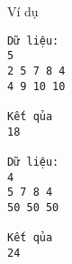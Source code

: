 Ví dụ
\begin{verbatim}
Dữ liệu:
5
2 5 7 8 4
4 9 10 10 

Kết qủa
18

Dữ liệu:
4
5 7 8 4
50 50 50 

Kết qủa
24
\end{verbatim}